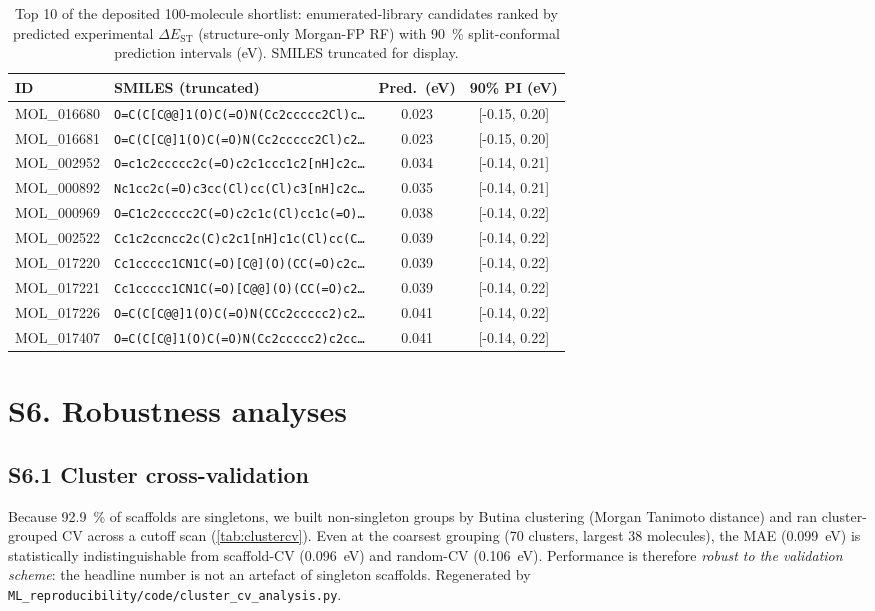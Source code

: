 \documentclass[twoside,twocolumn,9pt]{extarticle}
\begin{document}
\begin{table}[htbp]
  \centering
  \caption{Top \num{10} of the deposited \num{100}-molecule shortlist: enumerated-library
    candidates ranked by predicted experimental $\Delta E_\text{ST}$ (structure-only
    Morgan-FP RF) with \qty{90}{\percent} split-conformal prediction intervals (eV).
    SMILES truncated for display.}
  \label{tab:shortlist}
  \scriptsize
  \begin{tabular}{@{}ll@{}cc@{}}
    \toprule
    ID & SMILES (truncated) & Pred.\ (eV) & 90\% PI (eV) \\
    \midrule
    MOL\_016680 & \texttt{O=C(C[C@@]1(O)C(=O)N(Cc2ccccc2Cl)c…} & 0.023 & [-0.15, 0.20] \\
    MOL\_016681 & \texttt{O=C(C[C@]1(O)C(=O)N(Cc2ccccc2Cl)c2…} & 0.023 & [-0.15, 0.20] \\
    MOL\_002952 & \texttt{O=c1c2ccccc2c(=O)c2c1ccc1c2[nH]c2c…} & 0.034 & [-0.14, 0.21] \\
    MOL\_000892 & \texttt{Nc1cc2c(=O)c3cc(Cl)cc(Cl)c3[nH]c2c…} & 0.035 & [-0.14, 0.21] \\
    MOL\_000969 & \texttt{O=C1c2ccccc2C(=O)c2c1c(Cl)cc1c(=O)…} & 0.038 & [-0.14, 0.22] \\
    MOL\_002522 & \texttt{Cc1c2ccncc2c(C)c2c1[nH]c1c(Cl)cc(C…} & 0.039 & [-0.14, 0.22] \\
    MOL\_017220 & \texttt{Cc1ccccc1CN1C(=O)[C@](O)(CC(=O)c2c…} & 0.039 & [-0.14, 0.22] \\
    MOL\_017221 & \texttt{Cc1ccccc1CN1C(=O)[C@@](O)(CC(=O)c2…} & 0.039 & [-0.14, 0.22] \\
    MOL\_017226 & \texttt{O=C(C[C@@]1(O)C(=O)N(CCc2ccccc2)c2…} & 0.041 & [-0.14, 0.22] \\
    MOL\_017407 & \texttt{O=C(C[C@]1(O)C(=O)N(Cc2ccccc2)c2cc…} & 0.041 & [-0.14, 0.22] \\
    \bottomrule
  \end{tabular}
\end{table}

\section*{S6. Robustness analyses}

\subsection*{S6.1 Cluster cross-validation}
Because \qty{92.9}{\percent} of scaffolds are singletons, we built non-singleton groups
by Butina clustering (Morgan Tanimoto distance) and ran cluster-grouped CV across a
cutoff scan (\cref{tab:clustercv}). Even at
the coarsest grouping (\num{70} clusters, largest \num{38} molecules), the MAE
(\qty{0.099}{\electronvolt}) is statistically indistinguishable from scaffold-CV
(\qty{0.096}{\electronvolt}) and random-CV (\qty{0.106}{\electronvolt}). Performance is
therefore \emph{robust to the validation scheme}: the headline number is not an artefact of
singleton scaffolds. Regenerated by \texttt{ML\_reproducibility/code/cluster\_cv\_analysis.py}.
\end{document}
